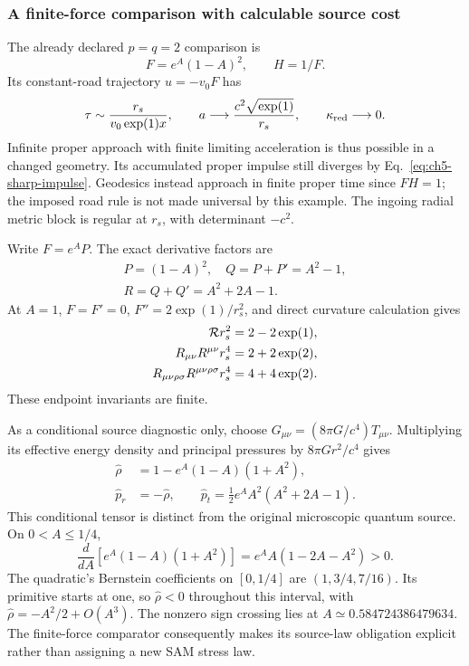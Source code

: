\documentclass[10pt,twocolumn,letterpaper]{article}
\begin{document}
\subsubsection{A finite-force comparison with calculable source cost}
The already declared $p=q=2$ comparison is
\[
 F=e^A(1-A)^2,\qquad H=1/F.
\]
Its constant-road trajectory $u=-v_0F$ has
\[
 \tau\sim\frac{r_s}{v_0\exp(1)x},\qquad
 a\longrightarrow\frac{c^2\sqrt{\exp(1)}}{r_s},\qquad
 \kappa_{\rm red}\longrightarrow0.
\]
Infinite proper approach with finite limiting acceleration is thus
possible in a changed geometry. Its accumulated proper impulse still
diverges by Eq.~\eqref{eq:ch5-sharp-impulse}. Geodesics instead approach
in finite proper time since $FH=1$; the imposed road rule is not made
universal by this example. The ingoing radial metric block is regular
at $r_s$, with determinant $-c^2$.

Write $F=e^AP$. The exact derivative factors are
\[
\begin{gathered}P=(1-A)^2,\quad Q=P+P'=A^2-1,\\
 R=Q+Q'=A^2+2A-1.\end{gathered}
\]
At $A=1$, $F=F'=0$, $F''=2\exp(1)/r_s^2$, and direct curvature
calculation gives
\begin{align*}
 {\cal R}r_s^2&=2-2\exp(1),\\
 R_{\mu\nu}R^{\mu\nu}r_s^4&=2+2\exp(2),\\
 R_{\mu\nu\rho\sigma}R^{\mu\nu\rho\sigma}r_s^4
   &=4+4\exp(2).
\end{align*}
These endpoint invariants are finite.

As a conditional source diagnostic only, choose
$G_{\mu\nu}=(8\pi G/c^4)T_{\mu\nu}$. Multiplying its effective
energy density and principal pressures by $8\pi Gr^2/c^4$ gives
\begin{align}
 \widehat\rho&=1-e^A(1-A)(1+A^2),\nonumber\\
 \widehat p_r&=-\widehat\rho,\qquad
 \widehat p_t=\tfrac12e^AA^2(A^2+2A-1).
 \label{eq:ch5-comparison-source}
\end{align}
This conditional tensor is distinct from the original microscopic
quantum source. On $0<A\leq1/4$,
\[
 \frac d{dA}[e^A(1-A)(1+A^2)]
       =e^AA(1-2A-A^2)>0.
\]
The quadratic's Bernstein coefficients on $[0,1/4]$ are
$(1,3/4,7/16)$. Its primitive starts at one, so
$\widehat\rho<0$ throughout this interval, with
$\widehat\rho=-A^2/2+O(A^3)$. The nonzero sign crossing lies at
$A\simeq0.584724386479634$. The finite-force comparator consequently
makes its source-law obligation explicit rather than assigning a new
SAM stress law.
\end{document}
